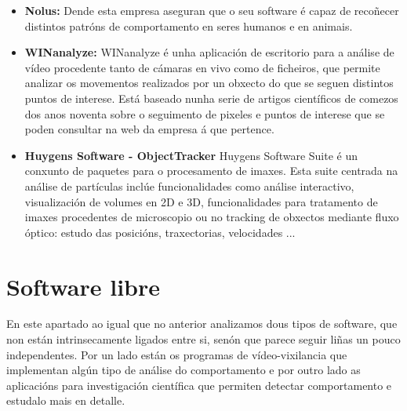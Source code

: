         \begin{itemize}
        \item  \textbf{Nolus:}\cite{nolus-human-behaviour}
            Dende esta empresa aseguran que o seu software é capaz de recoñecer distintos patróns de 
            comportamento en seres humanos e en animais.
        
        \item \textbf{WINanalyze:}\cite{WINanalyze-web-page}
            WINanalyze é unha aplicación de escritorio para a análise de vídeo procedente tanto de 
            cámaras en vivo como de ficheiros, que permite analizar os movementos realizados por un 
            obxecto do que se seguen distintos puntos de interese. Está baseado nunha serie de artigos
            científicos de comezos dos anos noventa sobre o seguimento de pixeles e puntos de interese
            que se poden consultar na web da empresa á que pertence\cite{mikromak-publications}.
        
        \item \textbf{Huygens Software - ObjectTracker}\cite{Huygens-ObjectTracker}
            Huygens Software Suite é un conxunto de paquetes para o procesamento de imaxes.
            Esta suite centrada na análise de partículas inclúe funcionalidades como análise interactivo,
            visualización de volumes en 2D e 3D, funcionalidades para tratamento de imaxes procedentes
            de microscopio ou no tracking de obxectos mediante fluxo óptico: estudo das posicións,
            traxectorias, velocidades ...
            
        \end{itemize}

    \section{Software libre}

        En este apartado ao igual que no anterior analizamos dous tipos de software, que non están
        intrinsecamente ligados entre si, senón que parece seguir liñas un pouco independentes. Por
        un lado están os programas de vídeo-vixilancia que implementan algún tipo de análise do
        comportamento e por outro lado as aplicacións para investigación científica que permiten 
        detectar comportamento e estudalo mais en detalle.
        
